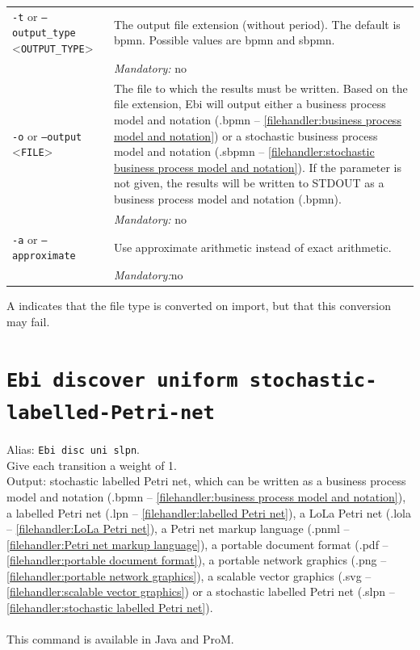 {\begin{tabularx}{\linewidth}{lX}
\texttt{-t} or \texttt{--output\_type} <\texttt{OUTPUT\_TYPE}> &
The output file extension (without period). The default is bpmn. Possible values are bpmn and sbpmn.\\
&\textit{Mandatory:} \quad no\\
\texttt{-o} or \texttt{--output} <\texttt{FILE}> &
The file to which the results must be written. Based on the file extension, Ebi will output either a business process model and notation (.bpmn -- \cref{filehandler:business process model and notation}) or a stochastic business process model and notation (.sbpmn -- \cref{filehandler:stochastic business process model and notation}).
If the parameter is not given, the results will be written to STDOUT as a business process model and notation (.bpmn).\\
&\textit{Mandatory:} \quad no\\
\texttt{-a} or \texttt{--approximate} & Use approximate arithmetic instead of exact arithmetic.\\
&\textit{Mandatory:}\quad no\\
\bottomrule
\end{tabularx}
A \textdagger{} indicates that the file type is converted on import, but that this conversion may fail.
\clearpage\section{\texttt{Ebi discover uniform stochastic-labelled-Petri-net}}
\label{command:Ebi discover uniform stochastic-labelled-Petri-net}
Alias: \texttt{Ebi disc uni slpn}.\\
Give each transition a weight of 1.\\
\noindent Output: stochastic labelled Petri net, which can be written as a business process model and notation (.bpmn -- \cref{filehandler:business process model and notation}), a labelled Petri net (.lpn -- \cref{filehandler:labelled Petri net}), a LoLa Petri net (.lola -- \cref{filehandler:LoLa Petri net}), a Petri net markup language (.pnml -- \cref{filehandler:Petri net markup language}), a portable document format (.pdf -- \cref{filehandler:portable document format}), a portable network graphics (.png -- \cref{filehandler:portable network graphics}), a scalable vector graphics (.svg -- \cref{filehandler:scalable vector graphics}) or a stochastic labelled Petri net (.slpn -- \cref{filehandler:stochastic labelled Petri net}).\\
\\This command is available in Java and ProM.
}
